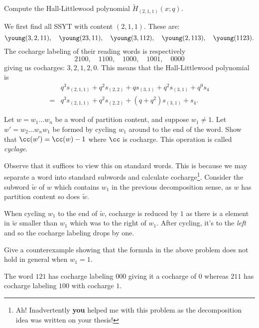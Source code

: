 \documentclass[12pt]{memoir}
\begin{document}
\begin{Ej}
    Compute the Hall-Littlewood polynomial $\tilde{H}_{(2,1,1)}(x;q)$.
\end{Ej}
\begin{ptcbr}
    We first find all SSYT with content $(2,1,1)$. These are:
$$\young(3,2,11),\quad\young(23,11),\quad\young(3,112),\quad\young(2,113),\quad\young(1123).$$
The cocharge labeling of their reading words is respectively
$$2100,\quad1100,\quad1000,\quad1001,\quad0000$$
giving us cocharges: $3,2,1,2,0$. This means that the Hall-Littlewood polynomial is 
\begin{align*}
    &q^3s_{(2,1,1)}+q^2s_{(2,2)}+qs_{(3,1)}+q^2s_{(3,1)}+q^0s_4\\
    =&q^3s_{(2,1,1)}+q^2s_{(2,2)}+(q+q^2)s_{(3,1)}+s_4.
\end{align*}

\end{ptcbr}

\begin{Ej}
    Let $w=w_1\dots w_n$ be a word of partition content, and suppose $w_1\neq 1$. Let $w'=w_2\dots w_nw_1$ be formed by cycling $w_1$ around to the end of the word. Show that $\cc(w')=\cc(w)-1$ where $\cc$ is cocharge. This operation is called \emph{cyclage}.
\end{Ej}

\begin{ptcbr}
Observe that it suffices to view this on standard words. This is because we may separate a word into standard subwords and calculate cocharge\footnote{Ah! Inadvertently \textbf{you} helped me with this problem as the decomposition idea was written on your thesis!}. Consider the subword $\tilde{w}$ of $w$ which contains $w_1$ in the previous decomposition sense, as $w$ has partition content so does $\tilde{w}$.\par
When cycling $w_1$ to the end of $\tilde{w}$, cocharge is reduced by $1$ as there is a element in $\tilde{w}$ smaller than $w_1$ which was to the right of $w_1$. After cycling, it's to the \emph{left} and so the cocharge labeling drops by one. 
\end{ptcbr}

\begin{Ej}
    Give a counterexample showing that the formula in the above problem does not hold in general when $w_1=1$.
\end{Ej}

\begin{ptcbr}
The word $121$ has cocharge labeling $000$ giving it a cocharge of $0$ whereas $211$ has cocharge labeling $100$ with cocharge $1$.
\end{ptcbr}
\end{document}
